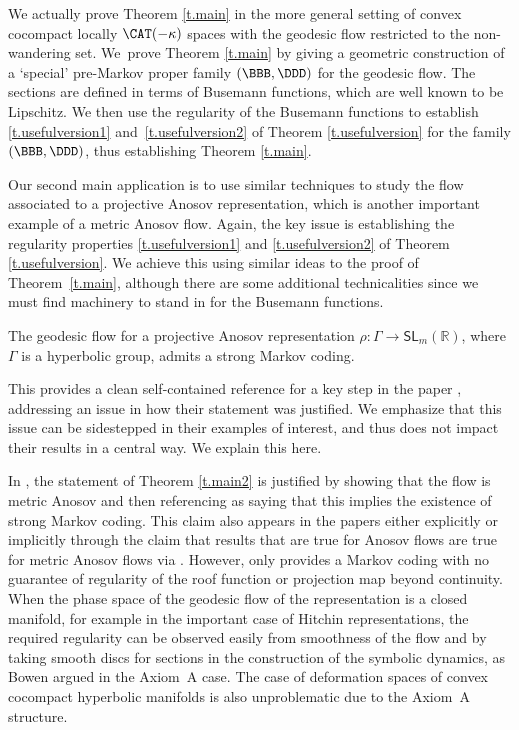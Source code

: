 We actually prove Theorem \ref{t.main} in the more general setting of convex cocompact locally $\CAT(-\kappa)$ spaces with the geodesic flow restricted to the non-wandering set. We~prove Theorem \ref{t.main} by giving a geometric construction of a `special' pre-Markov proper family $(\BBB, \DDD)$ for the geodesic flow. The sections are defined in terms of Busemann functions, which are well known to be Lipschitz. We then use the regularity of the Busemann functions to establish \eqref{t.usefulversion1} and~\eqref{t.usefulversion2} of Theorem \ref{t.usefulversion} for the family $(\BBB, \DDD)$, thus establishing Theorem \ref{t.main}.

Our second main application is to use similar techniques to study the flow associated to a projective Anosov representation, which is another important example of a metric Anosov flow. Again, the key issue is establishing the regularity properties \eqref{t.usefulversion1} and \eqref{t.usefulversion2} of Theorem \ref{t.usefulversion}. We achieve this using similar ideas to the proof of Theorem~\ref{t.main}, although there are some additional technicalities since we must find machinery to stand in for the Busemann functions.

\begin{thmx} \label{t.main2}
The geodesic flow for a projective Anosov representation $\rho: \Gamma \to \mathsf{SL}_m(\mathbb{R})$, where $\Gamma$ is a hyperbolic group, admits a strong Markov coding.
\end{thmx}

This provides a clean self-contained reference for a key step in the paper \cite{bcls}, addressing an issue in how their statement was justified. We emphasize that this issue can be sidestepped in their examples of interest, and thus does not impact their results in a central way. We explain this here.

In \cite{bcls}, the statement of Theorem \ref{t.main2} is justified by showing that the flow is metric Anosov \cite[Prop.\,5.1]{bcls} and then referencing \cite{pollicott} as saying that this implies the existence of strong Markov coding. This claim also appears in the papers \cite{BC17, BCLS18, PS17, aS16} either explicitly or implicitly through the claim that results that are true for Anosov flows are true for metric Anosov flows via \cite{pollicott}. However, \cite[Th.\,1]{pollicott} only provides a Markov coding with no guarantee of regularity of the roof function or projection map beyond continuity. When the phase space of the geodesic flow of the representation is a closed manifold, for example in the important case of Hitchin representations, the required regularity can be observed easily from smoothness of the flow and by taking smooth discs for sections in the construction of the symbolic dynamics, as Bowen argued in the Axiom~A case. The case of deformation spaces of convex cocompact hyperbolic manifolds is also unproblematic due to the Axiom~A structure.

